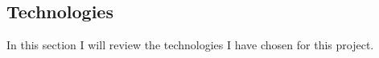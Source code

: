 \subsection{Technologies}

In this section I will review the technologies I have chosen for this project.




